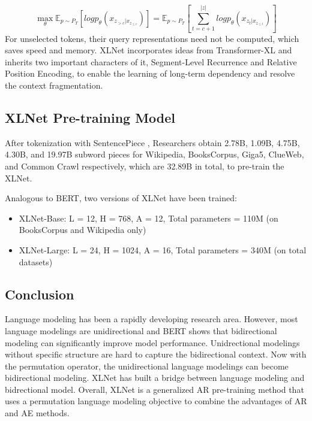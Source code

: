 \documentclass[]{krantz}
\providecommand{\tightlist}{%
  \setlength{\itemsep}{0pt}\setlength{\parskip}{0pt}}
\begin{document}
\begin{equation}
\max_{\theta}   \mathbb{E}_{p\sim P_T} \left[logp_{\theta}(x_{z_{>c}|x_{z_{\leq c}}})\right] =
\mathbb{E}_{p\sim P_T} \left[\sum_{t=c+1}^{|z|} logp_{\theta}(x_{z_t|x_{z_{\leq t}}})\right]
\end{equation}
For unselected tokens, their query representations need not be computed, which saves speed and memory. XLNet incorporates ideas from Transformer-XL and inherits two important characters of it, Segment-Level Recurrence and Relative Position Encoding, to enable the learning of long-term dependency and resolve the context fragmentation.

\hypertarget{xlnet-pre-training-model}{%
\subsection{XLNet Pre-training Model}\label{xlnet-pre-training-model}}

After tokenization with SentencePiece \citet{kudo2018sentencepiece}, Researchers obtain 2.78B, 1.09B, 4.75B, 4.30B, and 19.97B subword pieces for Wikipedia, BooksCorpus, Giga5, ClueWeb, and Common Crawl respectively, which are 32.89B in total, to pre-train the XLNet.

Analogous to BERT, two versions of XLNet have been trained:

\begin{itemize}
\tightlist
\item
  XLNet-Base: L = 12, H = 768, A = 12, Total parameters = 110M (on BooksCorpus and Wikipedia only)
\item
  XLNet-Large: L = 24, H = 1024, A = 16, Total parameters = 340M (on total datasets)
\end{itemize}

\hypertarget{conclusion-1}{%
\subsection{Conclusion}\label{conclusion-1}}

Language modeling has been a rapidly developing research area. However, most language modelings are unidirectional and BERT \citet{bert} shows that bidirectional modeling can significantly improve model performance. Unidrectional modelings without specific structure are hard to capture the bidirectional context. Now with the permutation operator, the unidirectional language modelings can become bidirectional modeling. XLNet has built a bridge between language modeling and bidrectional model. Overall, XLNet is a generalized AR pre-training method that uses a permutation language modeling objective to combine the advantages of AR and AE methods.
\end{document}
